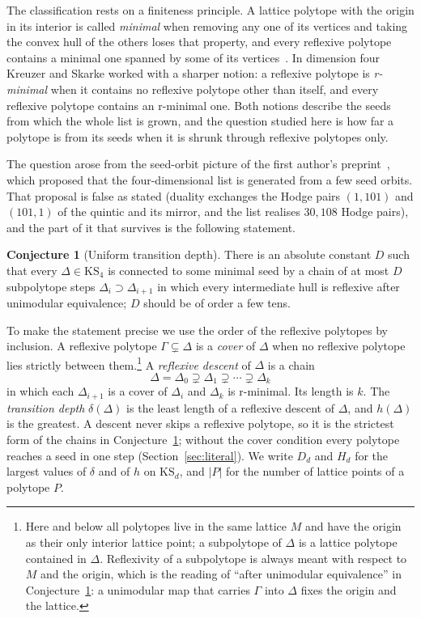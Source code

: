 \documentclass[11pt]{amsart}
\theoremstyle{definition}
\newtheorem{conjecture}[theorem]{Conjecture}
\theoremstyle{remark}
\newcommand{\KS}{\mathrm{KS}}
\begin{document}
The classification rests on a finiteness principle. A lattice polytope with
the origin in its interior is called \emph{minimal} when removing any one
of its vertices and taking the convex hull of the others loses that
property, and every reflexive polytope contains a minimal one spanned by
some of its vertices~\cite{KS97,KS00}. In dimension four Kreuzer and
Skarke worked with a sharper notion: a reflexive polytope is
\emph{r-minimal} when it contains no reflexive polytope other than itself,
and every reflexive polytope contains an r-minimal one. Both notions
describe the seeds from which the whole list is grown, and the question
studied here is how far a polytope is from its seeds when it is shrunk
through reflexive polytopes only.

The question arose from the seed-orbit picture of the first author's
preprint~\cite{Bha26a}, which proposed that the four-dimensional list is
generated from a few seed orbits. That proposal is false as stated
(duality exchanges the Hodge pairs $(1,101)$ and $(101,1)$ of the quintic
and its mirror, and the list realises $30{,}108$ Hodge pairs), and the
part of it that survives is the following statement.

\begin{conjecture}[Uniform transition depth]\label{conj:depth}
There is an absolute constant $D$ such that every $\Delta\in\KS_4$ is
connected to some minimal seed by a chain of at most $D$ subpolytope steps
$\Delta_i\supset\Delta_{i+1}$ in which every intermediate hull is
reflexive after unimodular equivalence; $D$ should be of order a few tens.
\end{conjecture}

To make the statement precise we use the order of the reflexive polytopes
by inclusion. A reflexive polytope $\Gamma\subsetneq\Delta$ is a
\emph{cover} of $\Delta$ when no reflexive polytope lies strictly between
them.\footnote{Here and below all polytopes live in the same lattice $M$
and have the origin as their only interior lattice point; a subpolytope of
$\Delta$ is a lattice polytope contained in $\Delta$. Reflexivity of a
subpolytope is always meant with respect to $M$ and the origin, which is
the reading of ``after unimodular equivalence'' in
Conjecture~\ref{conj:depth}: a unimodular map that carries $\Gamma$ into
$\Delta$ fixes the origin and the lattice.} A \emph{reflexive descent} of
$\Delta$ is a chain
\[
\Delta=\Delta_0\supsetneq\Delta_1\supsetneq\cdots\supsetneq\Delta_k
\]
in which each $\Delta_{i+1}$ is a cover of $\Delta_i$ and $\Delta_k$ is
r-minimal. Its length is $k$. The \emph{transition depth}
$\delta(\Delta)$ is the least length of a reflexive descent of $\Delta$,
and $h(\Delta)$ is the greatest. A descent never skips a reflexive
polytope, so it is the strictest form of the chains in
Conjecture~\ref{conj:depth}; without the cover condition every polytope
reaches a seed in one step (Section~\ref{sec:literal}). We write $D_d$ and
$H_d$ for the largest values of $\delta$ and of $h$ on $\KS_d$, and $|P|$
for the number of lattice points of a polytope $P$.
\end{document}
